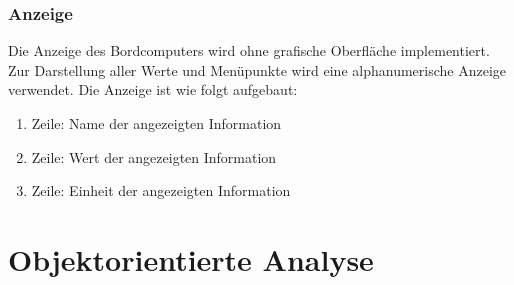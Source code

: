 \documentclass[a4paper,12pt]{article}
\begin{document}
\subsubsection{Anzeige}

Die Anzeige des Bordcomputers wird ohne grafische Oberfläche implementiert. Zur Darstellung aller Werte und Menüpunkte wird eine alphanumerische Anzeige verwendet. Die Anzeige ist wie folgt aufgebaut:

\begin{enumerate}
	\item Zeile: Name der angezeigten Information
	\item Zeile: Wert der angezeigten Information
	\item Zeile: Einheit der angezeigten Information
\end{enumerate}

\section{Objektorientierte Analyse}
\end{document}
